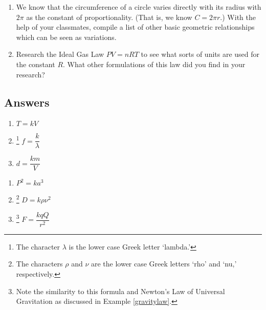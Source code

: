\begin{enumerate}
\begin{enumerate}
\end{enumerate}

\item We know that the circumference of a circle varies directly with its radius with $2\pi$ as the constant of proportionality. (That is, we know $C = 2\pi r.$)  With the help of your classmates, compile a list of other basic geometric relationships which can be seen as variations.

\item \label{idealgasexercise} Research the Ideal Gas Law $PV = nRT$ to see what sorts of units are used for the constant $R$.  What other formulations of this law did you find in your research?

\end{enumerate}

\newpage

\subsection{Answers}

\begin{multicols}{3}
\begin{enumerate}

\item $T = k V$

\item \hspace{-.1in} \footnote{The character $\lambda$ is the lower case Greek letter `lambda.'} $f = \dfrac{k}{\lambda}$

\item $d = \dfrac{k m}{V}$ 

\setcounter{HW}{\value{enumi}}
\end{enumerate}
\end{multicols}


\begin{multicols}{3}
\begin{enumerate}
\setcounter{enumi}{\value{HW}}

\item $P^2 = k a^3$

\item \hspace{-.1in} \footnote{The characters $\rho$ and $\nu$ are the lower case Greek letters `rho' and `nu,' respectively.} $D = k \rho \nu^2$

\item \hspace{-.1in} \footnote{Note the similarity to this formula and Newton's Law of Universal Gravitation as discussed in Example \ref{gravitylaw}.}  $F = \dfrac{kqQ}{r^2}$   

\setcounter{HW}{\value{enumi}}
\end{enumerate}
\end{multicols}

